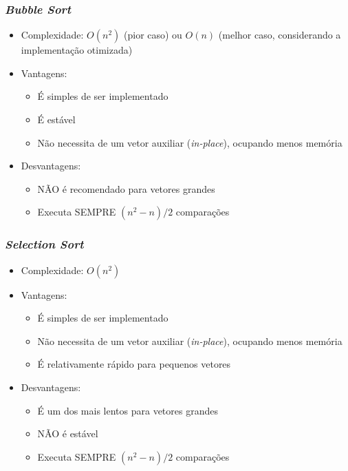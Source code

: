 \documentclass[aspectratio=169]{beamer}
\begin{document}
\begin{frame}\frametitle{\emph{Bubble Sort}}
\begin{itemize}
	\item Complexidade: $O(n^2)$ (pior caso) ou $O(n)$ (melhor caso, considerando a implementação otimizada)
	\item Vantagens:
	\begin{itemize}	
		\item É simples de ser implementado
		\item É estável
		\item Não necessita de um vetor auxiliar (\emph{in-place}), ocupando menos memória
	\end{itemize}
	\item Desvantagens:
	\begin{itemize}	
		\item NÃO é recomendado para vetores grandes
		\item Executa SEMPRE $(n^2-n)/2$ comparações
	\end{itemize}
\end{itemize}
\end{frame}

\begin{frame}\frametitle{\emph{Selection Sort}}
\begin{itemize}
	\item Complexidade: $O(n^2)$
	\item Vantagens:
	\begin{itemize}	
		\item É simples de ser implementado
		\item Não necessita de um vetor auxiliar (\emph{in-place}), ocupando menos memória
		\item É relativamente rápido para pequenos vetores
	\end{itemize}
	\item Desvantagens:
	\begin{itemize}	
		\item É um dos mais lentos para vetores grandes
		\item NÃO é estável
		\item Executa SEMPRE $(n^2-n)/2$ comparações
	\end{itemize}
\end{itemize}
\end{frame}
\end{document}

